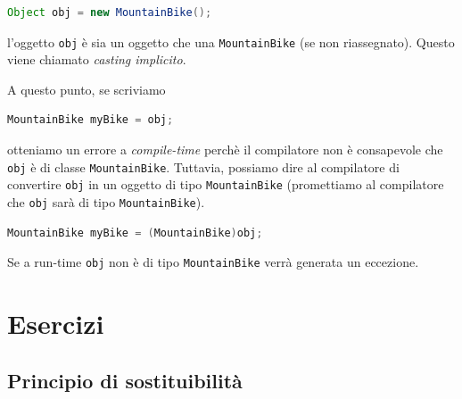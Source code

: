 \documentclass{article}
\begin{document}
\begin{lstlisting}[language=Java,escapechar=|]
Object obj = new MountainBike();
\end{lstlisting}
l'oggetto \texttt{obj} \`e sia un oggetto che una \texttt{MountainBike} (se non riassegnato). Questo viene chiamato \emph{casting implicito}.

A questo punto, se scriviamo 
\begin{lstlisting}[language=Java,escapechar=|]
MountainBike myBike = obj;
\end{lstlisting}
otteniamo un errore a \emph{compile-time} perch\`e il compilatore non \`e consapevole che \texttt{obj} \`e di classe \texttt{MountainBike}. Tuttavia, possiamo dire al compilatore di convertire \texttt{obj} in un oggetto di tipo \texttt{MountainBike} (promettiamo al compilatore che \texttt{obj} sar\`a di tipo \texttt{MountainBike}).

\begin{lstlisting}[language=Java,escapechar=|]
MountainBike myBike = (MountainBike)obj;
\end{lstlisting}
Se a run-time \texttt{obj} non \`e di tipo \texttt{MountainBike} verr\`a generata un eccezione.

\section{Esercizi}


\subsection{Principio di sostituibilit\`a}
\end{document}

